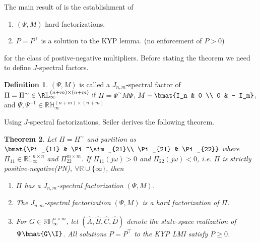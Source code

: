 \documentclass[11pt,a4paper,onecolumn]{article}
\newtheorem{theorem}{Theorem}
\theoremstyle{definition}
\newtheorem{definition}[theorem]{Definition}
\theoremstyle{remark}
\begin{document}
The main result of \cite{6915700} is the establishment of 
\begin{enumerate}
    \item $(\Psi, M)$ hard factorizations.
    \item $P=P^\top$ is a solution to the KYP lemma. (no enforcement of $P>0$)
\end{enumerate}
for the class of postive-negative multipliers. Before stating the theorem we need to define $J$-spectral factors.
\begin{definition}
    $(\Psi, M)$ is called a $J_{n,m}$-spectral factor of $\Pi = \Pi^\sim\in\R\mathbb{L}_\infty^{(n+m)\times(n+m)}$ if $\Pi = \Psi^\sim M \Psi$, $M - \bmat{I_n & 0 \\ 0 & - I_m}$, and
    $\Psi,\Psi^{-1}\in\mathbb{RH}_\infty^{(n+m)\times(n+m)}$
\end{definition}
Using $J$-spectral factorizations, Seiler \cite{6915700} derives the following theorem.
\begin{theorem}
    Let $\Pi=\Pi^\sim$ and partition as $\bmat{\Pi_{11} & \Pi^\sim_{21}\\ \Pi_{21} & \Pi_{22}}$ where $\Pi_{11}\in\mathbb{RL}_\infty^{n\times n}$ and $\Pi_{22}^{m\times m}$. If
    $\Pi_{11}(j \omega)>0$ and $\Pi_{22}(j\omega)<0$, i.e. $\Pi$ is strictly positive-negative(PN), $\forall\mathbb{R}\cup\{\infty\}$, then
    \begin{enumerate}
        \item $\Pi$ has a $J_{n,m}$-spectral factorization $(\Psi, M)$.
        \item The $J_{n,m}$-spectral factorization $(\Psi,M)$ is a hard factorization of $\Pi$.
        \item For $G\in\mathbb{RH}_\infty^{n\times m}$, let $(\hat{A},\hat{B},\hat{C},\hat{D})$ denote the state-space realization of $\Psi\bmat{G\\I}$. All solutions
              $P=P^\top$ to the KYP LMI satisfy $P\geq 0$.
    \end{enumerate}
\end{theorem}



\end{document}

